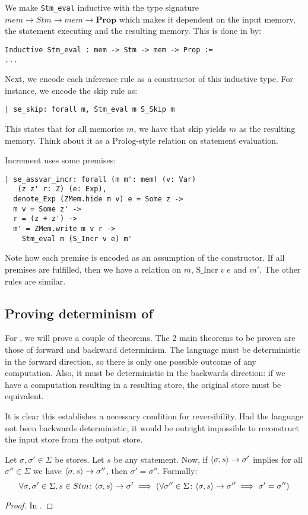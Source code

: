 We make \texttt{Stm\_eval} inductive with the type signature $mem \to
Stm \to mem \to \mathbf{Prop}$ which makes it dependent on the input
memory, the statement executing and the resulting memory. This is done
in \coq{} by:
\begin{verbatim}
Inductive Stm_eval : mem -> Stm -> mem -> Prop :=
...
\end{verbatim}

Next, we encode each inference rule as a constructor of this inductive
type. For instance, we encode the skip rule as:
\begin{verbatim}
| se_skip: forall m, Stm_eval m S_Skip m
\end{verbatim}
This states that for all memories $m$, we have that skip yields $m$ as
the resulting memory. Think about it as a Prolog-style relation on
statement evaluation.

Increment uses some premises:
\begin{verbatim}
| se_assvar_incr: forall (m m': mem) (v: Var)
   (z z' r: Z) (e: Exp),
  denote_Exp (ZMem.hide m v) e = Some z ->
  m v = Some z' ->
  r = (z + z') ->
  m' = ZMem.write m v r ->
    Stm_eval m (S_Incr v e) m'
\end{verbatim}
Note how each premise is encoded as an assumption of the
constructor. If all premises are fulfilled, then we have a relation on
$m$, $\text{S\_Incr}\; v\; e$ and $m'$. The other rules are similar.

\subsection{Proving determinism of \janusz{}}

For \janusz{}, we will prove a couple of theorems. The 2 main theorems
to be proven are those of forward and backward determinism. The
language must be deterministic in the forward direction, so there is
only one possible outcome of any computation. Also, it must be
deterministic in the backwards direction: if we have a computation
resulting in a resulting store, the original store must be equivalent.

It is clear this establishes a necessary condition for
reversibility. Had the language not been backwards deterministic, it
would be outright impossible to reconstruct the input store from the
output store.
\begin{lem}
\label{j0-fwd-det-prime}
  Let $\sigma, \sigma' \in \Sigma$ be stores. Let $s$ be any \janusz{}
  statement. Now, if $\langle \sigma, s \rangle -> \sigma'$ implies for all $\sigma''
  \in \Sigma$ we have $\langle \sigma, s \rangle -> \sigma''$, then $\sigma' =
  \sigma''$. Formally:
  \begin{equation*}
    \forall \sigma, \sigma' \in \Sigma, s \in Stm \colon
    \langle \sigma, s \rangle -> \sigma' \implies (\forall \sigma'' \in \Sigma
    \colon \langle \sigma, s \rangle -> \sigma'' \implies \sigma' = \sigma'')
  \end{equation*}
\end{lem}
\begin{proof}
  In \coq{}.
\end{proof}

